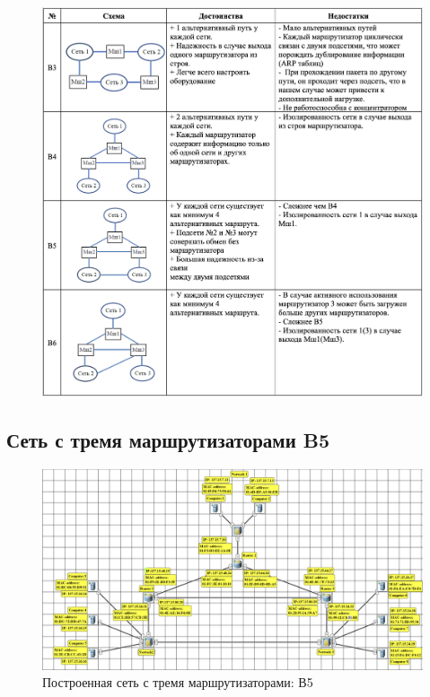 \documentclass[12pt,onecolumn]{article}
\begin{document}
\begin{figure}[H]
    \centering
    \includegraphics[width=\textwidth]{image/part-3/table.png}
\end{figure}

\subsection{Сеть с тремя маршрутизаторами B5}
\begin{figure}[H]
    \centering
    \includegraphics[width=\textwidth]{image/part-3/net3.png}
    \caption{Построенная сеть с тремя маршрутизаторами: В5}
\end{figure}
\end{document}
